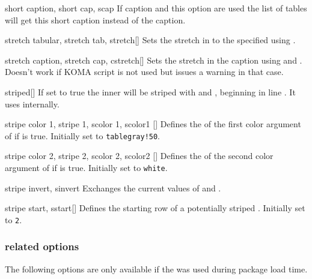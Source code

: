 \begin{describeopt}{short caption, short cap, scap}%
  If caption and this option are used the list of tables will get this short
  caption instead of the caption.
\end{describeopt}%
\begin{describeopt}{stretch tabular, stretch tab, stretch}[]%
  Sets the stretch in  to the specified  using
  .
\end{describeopt}%
\begin{describeopt}{stretch caption, stretch cap, cstretch}[]%
  Sets the stretch in the caption using  and .
  Doesn't work if KOMA script is not used but issues a warning in that case.
\end{describeopt}%
\begin{describeopt}{striped}[]%
  If set to true the inner  will be striped with  and , beginning in line . It
  uses  internally.
\end{describeopt}%
\begin{describeopt}{stripe color 1, stripe 1, scolor 1, scolor1}%
  []
  Defines the  of the first color argument of  if
   is true. Initially set to \texttt{tablegray!50}.
\end{describeopt}%
\begin{describeopt}{stripe color 2, stripe 2, scolor 2, scolor2}%
  []
  Defines the  of the second color argument of  if
   is true. Initially set to \texttt{white}.
\end{describeopt}%
\begin{describeopt}{stripe invert, sinvert}%
  Exchanges the current values of  and .
\end{describeopt}%
\begin{describeopt}{stripe start, sstart}[]%
  Defines the starting row of a potentially striped . Initially
  set to \texttt{2}.
\end{describeopt}%

\subsubsection{ related options}%
The following options are only available if the  was used during
package load time.

